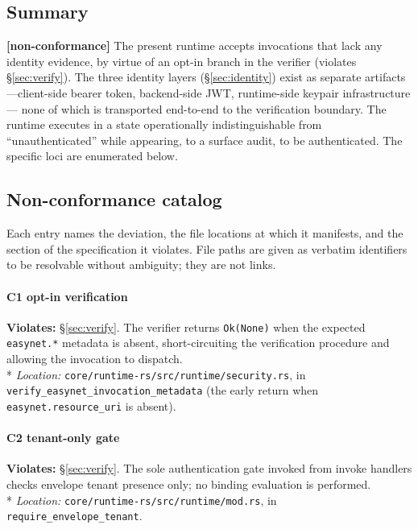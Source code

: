 \documentclass[11pt,a4paper]{article}
\newcommand{\defect}{\textcolor{defectcolor}{\textbf{[non-conformance]}}\xspace}
\begin{document}
\subsection{Summary}

\defect{} The present runtime accepts invocations that lack any
identity evidence, by virtue of an opt-in branch in the verifier
(violates \S\ref{sec:verify}). The three identity layers
(\S\ref{sec:identity}) exist as separate artifacts---client-side
bearer token, backend-side JWT, runtime-side keypair infrastructure---
none of which is transported end-to-end to the verification boundary.
The runtime executes in a state operationally indistinguishable from
``unauthenticated'' while appearing, to a surface audit, to be
authenticated. The specific loci are enumerated below.

\subsection{Non-conformance catalog}

Each entry names the deviation, the file locations at which it
manifests, and the section of the specification it violates. File
paths are given as verbatim identifiers to be resolvable without
ambiguity; they are not links.

\paragraph{C1 \textemdash{} opt-in verification}
\textbf{Violates:} \S\ref{sec:verify}.
The verifier returns \texttt{Ok(None)} when the expected
\texttt{easynet.*} metadata is absent, short-circuiting the
verification procedure and allowing the invocation to dispatch.
\\*
\emph{Location:} \texttt{core/runtime-rs/src/runtime/security.rs},
in \texttt{verify\_easynet\_invocation\_metadata} (the early return
when \texttt{easynet.resource\_uri} is absent).

\paragraph{C2 \textemdash{} tenant-only gate}
\textbf{Violates:} \S\ref{sec:verify}.
The sole authentication gate invoked from invoke handlers checks
envelope tenant presence only; no binding evaluation is performed.
\\*
\emph{Location:} \texttt{core/runtime-rs/src/runtime/mod.rs},
in \texttt{require\_envelope\_tenant}.
\end{document}
